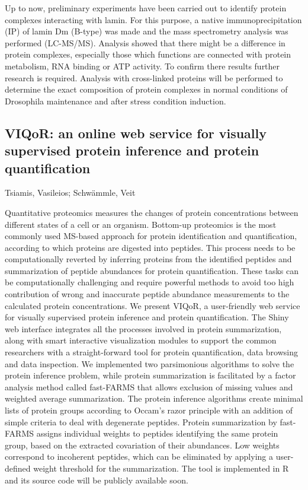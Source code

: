 {Up to now, preliminary experiments have been carried out to identify protein complexes interacting with lamin. For this purpose, a native immunoprecipitation (IP) of lamin Dm (B-type) was made and the mass spectrometry analysis was performed (LC-MS/MS). Analysis showed that there might be a difference in protein complexes, especially those which functions are connected with protein metabolism, RNA binding or ATP activity. To confirm there results further research is required. Analysis with cross-linked proteins will be performed to determine the exact composition of protein complexes in normal conditions of Drosophila maintenance and after stress condition induction.


\subsection*{\color{eubicRed} VIQoR: an online web service for visually supervised protein inference and protein quantification}
{\color{eubicGray}Tsiamis, Vasileios;
Schwämmle, Veit}

Quantitative proteomics measures the changes of protein concentrations between different states of a cell or an organism. Bottom-up proteomics is the most commonly used MS-based approach for protein identification and quantification, according to which proteins are digested into peptides. This process needs to be computationally reverted by inferring proteins from the identified peptides and summarization of peptide abundances for protein quantification. These tasks can be computationally challenging and require powerful methods to avoid too high contribution of wrong and inaccurate peptide abundance measurements to the calculated protein concentrations. We present VIQoR, a user-friendly web service for visually supervised protein inference and protein quantification. The Shiny web interface integrates all the processes involved in protein summarization, along with smart interactive visualization modules to support the common researchers with a straight-forward tool for protein quantification, data browsing and data inspection. We implemented two parsimonious algorithms to solve the protein inference problem, while protein summarization is facilitated by a factor analysis method called fast-FARMS that allows exclusion of missing values and weighted average summarization. The protein inference algorithms create minimal lists of protein groups according to Occam’s razor principle with an addition of simple criteria to deal with degenerate peptides. Protein summarization by fast-FARMS assigns individual weights to peptides identifying the same protein group, based on the extracted covariation of their abundances. Low weights correspond to incoherent peptides, which can be eliminated by applying a user-defined weight threshold for the summarization. The tool is implemented in R and its source code will be publicly available soon.


}
